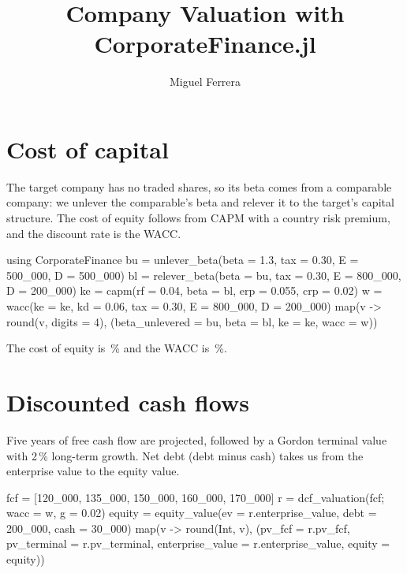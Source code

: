 \documentclass[a4paper]{article}
\title{Company Valuation with CorporateFinance.jl}
\author{Miguel Ferrera}
\begin{document}
\maketitle

\section{Cost of capital}

The target company has no traded shares, so its beta comes from a comparable company:
we unlever the comparable's beta and relever it to the target's capital structure.
The cost of equity follows from CAPM with a country risk premium, and the discount rate is the WACC.

\begin{juliacode}
using CorporateFinance
bu = unlever_beta(beta = 1.3, tax = 0.30, E = 500_000, D = 500_000)
bl = relever_beta(beta = bu, tax = 0.30, E = 800_000, D = 200_000)
ke = capm(rf = 0.04, beta = bl, erp = 0.055, crp = 0.02)
w = wacc(ke = ke, kd = 0.06, tax = 0.30, E = 800_000, D = 200_000)
map(v -> round(v, digits = 4), (beta_unlevered = bu, beta = bl, ke = ke, wacc = w))
\end{juliacode}

The cost of equity is \,\% and the WACC is \,\%.

\section{Discounted cash flows}

Five years of free cash flow are projected, followed by a Gordon terminal value with 2\,\% long-term growth.
Net debt (debt minus cash) takes us from the enterprise value to the equity value.

\begin{juliacode}
fcf = [120_000, 135_000, 150_000, 160_000, 170_000]
r = dcf_valuation(fcf; wacc = w, g = 0.02)
equity = equity_value(ev = r.enterprise_value, debt = 200_000, cash = 30_000)
map(v -> round(Int, v), (pv_fcf = r.pv_fcf, pv_terminal = r.pv_terminal,
                         enterprise_value = r.enterprise_value, equity = equity))
\end{juliacode}
\end{document}
